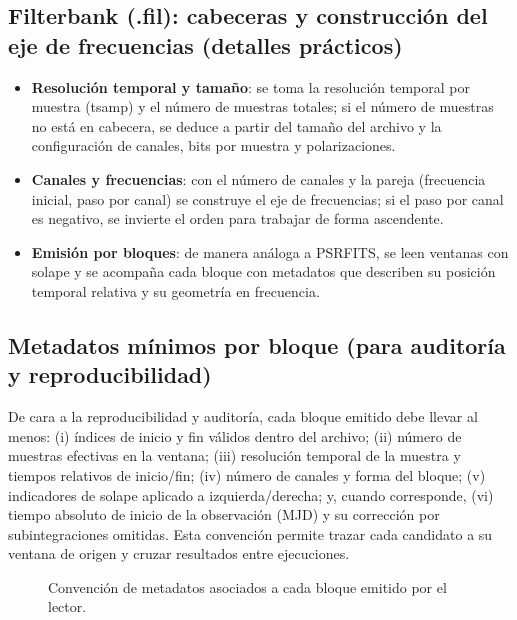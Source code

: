 \subsection*{Filterbank (.fil): cabeceras y construcción del eje de frecuencias (detalles prácticos)}
\begin{itemize}
  \item \textbf{Resolución temporal y tamaño}: se toma la resolución temporal por muestra (tsamp) y el número de muestras totales; si el número de muestras no está en cabecera, se deduce a partir del tamaño del archivo y la configuración de canales, bits por muestra y polarizaciones.
  \item \textbf{Canales y frecuencias}: con el número de canales y la pareja (frecuencia inicial, paso por canal) se construye el eje de frecuencias; si el paso por canal es negativo, se invierte el orden para trabajar de forma ascendente.
  \item \textbf{Emisión por bloques}: de manera análoga a PSRFITS, se leen ventanas con solape y se acompaña cada bloque con metadatos que describen su posición temporal relativa y su geometría en frecuencia.
\end{itemize}

\subsection*{Metadatos mínimos por bloque (para auditoría y reproducibilidad)}
De cara a la reproducibilidad y auditoría, cada bloque emitido debe llevar al menos: (i) índices de inicio y fin válidos dentro del archivo; (ii) número de muestras efectivas en la ventana; (iii) resolución temporal de la muestra y tiempos relativos de inicio/fin; (iv) número de canales y forma del bloque; (v) indicadores de solape aplicado a izquierda/derecha; y, cuando corresponde, (vi) tiempo absoluto de inicio de la observación (MJD) y su corrección por subintegraciones omitidas. Esta convención permite trazar cada candidato a su ventana de origen y cruzar resultados entre ejecuciones.

\begin{figure}[h!]
\centering
{}
\caption{Convención de metadatos asociados a cada bloque emitido por el lector.}
\label{fig:block_metadata}
\end{figure}

